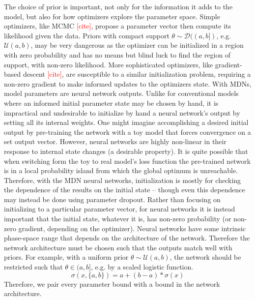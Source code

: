 \documentclass[twocolumn]{aastex631}
\newcommand{\mcal}[1]{\mathcal{#1}}
\newcommand{\TODO}[1]{{\textcolor{red}{#1}}}
\begin{document}
            The choice of prior is important, not only for the information it adds to the model, but also for how optimizers explore the parameter space. Simple optimizers, like MCMC \TODO{[cite]}, propose a parameter vector then compute its likelihood given the data. Priors with compact support  $\theta \sim \mcal{D}((a, b])$, e.g. $\mcal{U}(a, b)$, may be very dangerous as the optimizer can be initialized in a region with zero probability and has no means but blind luck to find the region of support, with non-zero likelihood. More sophisticated optimizers, like gradient-based descent \TODO{[cite]}, are susceptible to a similar initialization problem, requiring a non-zero gradient to make informed updates to the optimizers state.
            With MDNs, model parameters are neural network outputs. Unlike for conventional models where an informed initial parameter state may be chosen by hand, it is impractical and undesirable to initialize by hand a neural network's output by setting all its internal weights. One might imagine accomplishing a desired initial output by pre-training the network with a toy model that forces convergence on a set output vector. However,
            neural networks are highly non-linear in their response to internal state changes (a desirable property). It is quite possible that when switching form the toy to real model's loss function the pre-trained network is in 
            a local probability island from which the global optimum is unreachable.  
            Therefore, with the MDN neural networks, initialization is mostly for checking the dependence of the results on the initial state -- though even this dependence may instead be done using parameter dropout. Rather than 
            focusing on initializing to a particular parameter vector, for neural networks it is instead important that the initial state, whatever it is, has non-zero probability (or non-zero gradient, depending on the optimizer).
            Neural networks have some intrinsic phase-space range that depends on the architecture of the network. Therefore the network architecture must be chosen such that the outputs match well with priors. For example, with a
            uniform prior $\theta \sim \mcal{U}(a,b)$, the network should be restricted such that $\theta \in (a, b]$, e.g. by a scaled logistic function.
            \begin{equation}\label{eq:scaled_logistic}
                  \sigma(x, \{a,b\}) = a + (b - a) * \sigma(x)
            \end{equation}
            Therefore, we pair every parameter bound with a bound in the network architecture.
\end{document}
